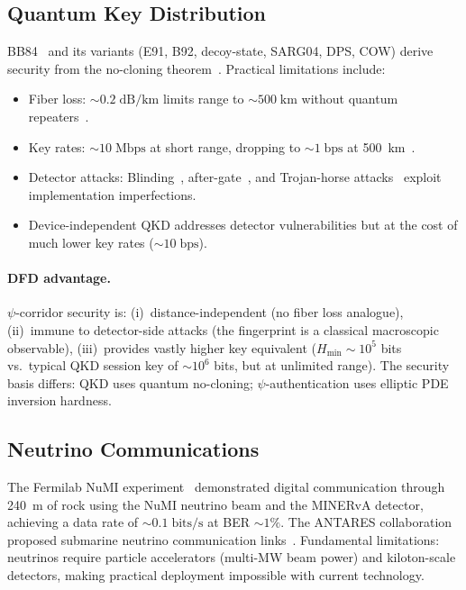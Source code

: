\documentclass[twocolumn,superscriptaddress,prd,nofootinbib]{revtex4-2}
\newcommand{\Hmin}{H_{\min}}
\begin{document}
\subsection{Quantum Key Distribution}

BB84~\cite{Bennett1984BB84} and its variants (E91, B92, decoy-state,
SARG04, DPS, COW) derive security from the no-cloning
theorem~\cite{Wiesner1983,Scarani2009QKDreview}. Practical limitations
include:
\begin{itemize}
\item Fiber loss: $\sim 0.2\;\text{dB/km}$ limits range to $\sim 500\;\text{km}$
without quantum repeaters~\cite{Takeoka2014,Pirandola2017}.
\item Key rates: $\sim 10\;\text{Mbps}$ at short range, dropping to
$\sim 1\;\text{bps}$ at 500~km~\cite{Boaron2018}.
\item Detector attacks: Blinding~\cite{Lydersen2010Blinding},
after-gate~\cite{Wiechers2011}, and Trojan-horse
attacks~\cite{Jain2014Trojan} exploit implementation imperfections.
\item Device-independent QKD addresses detector vulnerabilities but at
the cost of much lower key rates ($\sim 10\;\text{bps}$).
\end{itemize}

\paragraph{DFD advantage.}
$\psi$-corridor security is:
(i)~distance-independent (no fiber loss analogue),
(ii)~immune to detector-side attacks (the fingerprint is a
classical macroscopic observable),
(iii)~provides vastly higher key equivalent
($\Hmin \sim 10^5$ bits vs.\ typical QKD session key of $\sim 10^6$
bits, but at unlimited range).
The security basis differs: QKD uses quantum no-cloning;
$\psi$-authentication uses elliptic PDE inversion hardness.

\subsection{Neutrino Communications}

The Fermilab NuMI experiment~\cite{Stancil2012Neutrino} demonstrated
digital communication through 240~m of rock using the NuMI neutrino
beam and the MINERvA detector, achieving a data rate of
$\sim 0.1\;\text{bits/s}$ at BER $\sim 1\%$. The ANTARES
collaboration proposed submarine neutrino communication
links~\cite{Ageron2011ANTARES}. Fundamental limitations: neutrinos
require particle accelerators (multi-MW beam power) and kiloton-scale
detectors, making practical deployment impossible with current technology.
\end{document}
